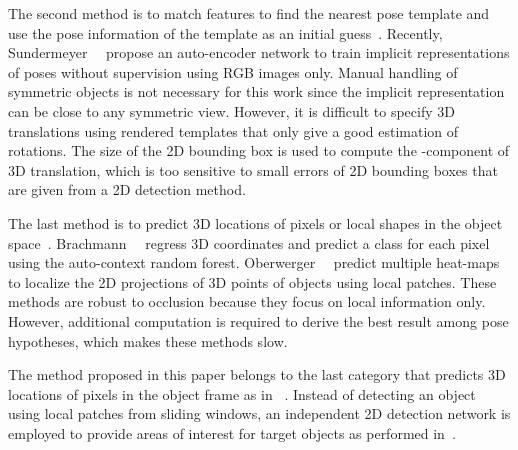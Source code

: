 \documentclass[10pt,twocolumn,letterpaper]{article}
\begin{document}
The second method is to match features to find the nearest pose template and use the pose information of the template as an initial guess~\cite{linemode_hinterstoisser2012}. Recently, Sundermeyer~\etal~\cite{Sundermeyer_2018_ECCV_implicit} propose an auto-encoder network to train implicit representations of poses without supervision using RGB images only. Manual handling of symmetric objects is not necessary for this work since the implicit representation can be close to any symmetric view. However, it is difficult to specify 3D translations using rendered templates that only give a good estimation of rotations. The size of the 2D bounding box is used to compute the -component of 3D translation, which is too sensitive to small errors of 2D bounding boxes that are given from a 2D detection method.

The last method is to predict 3D locations of pixels or local shapes in the object space~\cite{cnn_pose:brachmann2016uncertainty_only_rgb,kehl2016deep,Oberweger_2018_ECCV_heatmap}. Brachmann~\etal~\cite{cnn_pose:brachmann2016uncertainty_only_rgb} regress 3D coordinates and predict a class for each pixel using the auto-context random forest. Oberwerger~\etal~\cite{Oberweger_2018_ECCV_heatmap} predict multiple heat-maps to localize the 2D projections of 3D points of objects using local patches. These methods are robust to occlusion because they focus on local information only. However, additional computation is required to derive the best result among pose hypotheses, which makes these methods slow. 

The method proposed in this paper belongs to the last category that predicts 3D locations of pixels in the object frame as in ~\cite{brachmann2014learning_occlusion,cnn_pose:brachmann2016uncertainty_only_rgb}. Instead of detecting an object using local patches from sliding windows, an independent 2D detection network is employed to provide areas of interest for target objects as performed in~\cite{Sundermeyer_2018_ECCV_implicit}.
\end{document}
